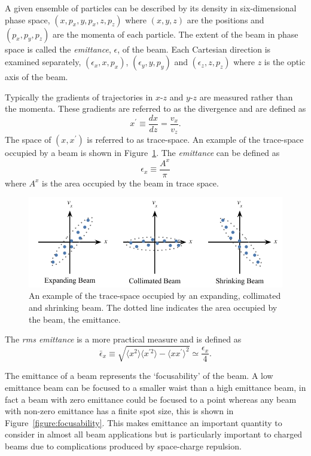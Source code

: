 A given ensemble of particles can be described by its density in six-dimensional phase space, $(x, p_x, y, p_x, z, p_z)$ where $(x, y, z)$ are the positions and $(p_x, p_y, p_z)$ are the momenta of each particle.
The extent of the beam in phase space is called the \emph{emittance}, $\epsilon$, of the beam.
Each Cartesian direction is examined separately, $(\epsilon_x, x, p_x)$, $(\epsilon_y, y, p_y)$ and $(\epsilon_z, z, p_z)$ where $z$ is the optic axis of the beam.

Typically the gradients of trajectories in $x$-$z$ and $y$-$z$ are measured rather than the momenta.
These gradients are referred to as the divergence and are defined as
\begin{equation}\label{equation:divergence}
x^\prime \equiv \frac{dx}{dz} = \frac{v_x}{v_z}.
\end{equation}
The space of $(x, x^\prime)$ is referred to as trace-space.
An example of the trace-space occupied by a beam is shown in Figure~\ref{figure:emittance_example}.
The \emph{emittance} can be defined as
\begin{equation}
\epsilon_x \equiv \frac{A^x}{\pi}
\end{equation}
where $A^x$ is the area occupied by the beam in trace space.

\begin{figure}
\center
\includegraphics{part2/Figs/EmittanceExample.pdf}
\caption{An example of the trace-space occupied by an expanding, collimated and shrinking beam. The dotted line indicates the area occupied by the beam, the emittance.}
\label{figure:emittance_example}
\end{figure}

The \emph{\gls{rms} emittance} is a more practical measure and is defined as
\begin{equation}\label{emittance}
\bar{\epsilon}_x \equiv \sqrt{\langle x^2\rangle \langle x^{\prime 2}\rangle - \langle x x^\prime\rangle^2} \simeq \frac{\epsilon_x}{4}.
\end{equation}

The emittance of a beam represents the `focusability' of the beam.
A low emittance beam can be focused to a smaller waist than a high emittance beam, in fact a beam with zero emittance could be focused to a point whereas any beam with non-zero emittance has a finite spot size, this is shown in Figure~\ref{figure:focusability}.
This makes emittance an important quantity to consider in almost all beam applications but is particularly important to charged beams due to complications produced by space-charge repulsion.

